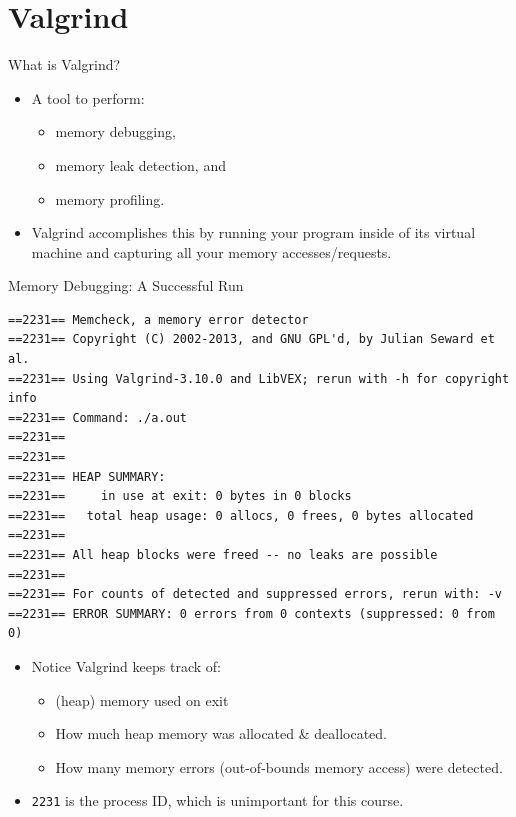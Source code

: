 \documentclass[14pt,aspectratio=1610]{beamer}
\begin{document}
\section{Valgrind}

\begin{frame}{What is Valgrind?}
\begin{itemize}
\item A tool to perform:
\begin{itemize}
\item memory debugging,
\item memory leak detection, and
\item memory profiling.
\end{itemize}
\item Valgrind accomplishes this by running your program inside of its virtual machine and capturing all your memory accesses/requests.
\end{itemize}
\end{frame}

\begin{frame}[fragile]{Memory Debugging: A Successful Run}
\begin{lstlisting}[basicstyle=\tiny\ttfamily\bfseries,identifierstyle=\color{white}]
==2231== Memcheck, a memory error detector
==2231== Copyright (C) 2002-2013, and GNU GPL'd, by Julian Seward et al.
==2231== Using Valgrind-3.10.0 and LibVEX; rerun with -h for copyright info
==2231== Command: ./a.out
==2231==
==2231==
==2231== HEAP SUMMARY:
==2231==     in use at exit: 0 bytes in 0 blocks
==2231==   total heap usage: 0 allocs, 0 frees, 0 bytes allocated
==2231==
==2231== All heap blocks were freed -- no leaks are possible
==2231==
==2231== For counts of detected and suppressed errors, rerun with: -v
==2231== ERROR SUMMARY: 0 errors from 0 contexts (suppressed: 0 from 0)
\end{lstlisting}
\begin{itemize}\vspace{-1em}
\item Notice Valgrind keeps track of:
\begin{itemize}
\item (heap) memory used on exit
\item How much heap memory was allocated \& deallocated.
\item How many memory errors (out-of-bounds memory access) were detected.
\end{itemize}
\item \lstinline{2231} is the process ID, which is unimportant for this course.
\end{itemize}
\end{frame}
\end{document}
